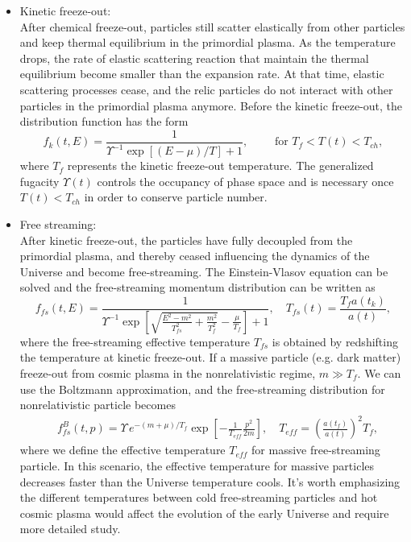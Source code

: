 {\begin{itemize}
\item Kinetic freeze-out:\\
After chemical freeze-out, particles  still scatter elastically from other particles and keep thermal equilibrium in the primordial plasma. As the temperature drops, the rate of elastic scattering reaction that maintain the thermal equilibrium become smaller than the expansion rate. At that time, elastic scattering processes cease, and the relic particles do not interact with other particles in the primordial plasma anymore. Before the kinetic freeze-out, the distribution function has the form
\begin{equation}\label{kinetic_equilib}
f_k(t,E)=\frac{1}{\Upsilon^{-1}\exp[(E-\mu)/T]+1},\qquad \text{ for }T_f< T(t)< T_{ch},
\end{equation}
where $T_f$ represents the kinetic freeze-out temperature. The generalized fugacity $\Upsilon(t)$ controls the occupancy of phase space and is necessary once $T(t)<T_{ch}$ in order to conserve particle number.


\item{Free streaming:}\\
After kinetic freeze-out, the particles have fully decoupled from the primordial plasma, and thereby ceased influencing the dynamics of the Universe and become free-streaming. The Einstein-Vlasov equation can be solved \cite{Choquet-Bruhat:2009xil} and the free-streaming momentum distribution can be written as \cite{Birrell:2012gg}
\begin{equation}\label{free_stream_dist}
f_{fs}(t,E)=\frac{1}{\Upsilon^{-1}\exp{\left[\sqrt{\frac{E^2-m^2}{T_{fs}^2}+\frac{m^2}{T^2_f}}-\frac{\mu}{T_f}\right]+1}},\quad T_{fs}(t)=\frac{T_fa(t_k)}{a(t)},
\end{equation}
where the free-streaming effective temperature $T_{fs}$ is obtained by redshifting the temperature at kinetic freeze-out. If a massive particle (e.g. dark matter) freeze-out from cosmic plasma in the nonrelativistic regime, $m\gg T_f$. We can use the
Boltzmann approximation, and the free-streaming distribution for nonrelativistic particle becomes
\begin{align}
&f^B_{fs}(t,p)=\Upsilon\,e^{-(m+\mu)/T_f}\exp\left[-\frac{1}{ T_{eff}}\frac{p^2}{2m}\right],\quad T_{eff}=\left(\frac{a(t_f)}{a(t)}\right)^2T_f,
\end{align}
where we define the effective temperature $T_{eff}$ for massive free-streaming particle. In this scenario, the effective temperature for massive particles decreases faster than the Universe temperature cools. It's worth emphasizing the different temperatures between cold free-streaming particles and hot cosmic plasma would affect the evolution of the early Universe and require more detailed study. 
\end{itemize}

}

